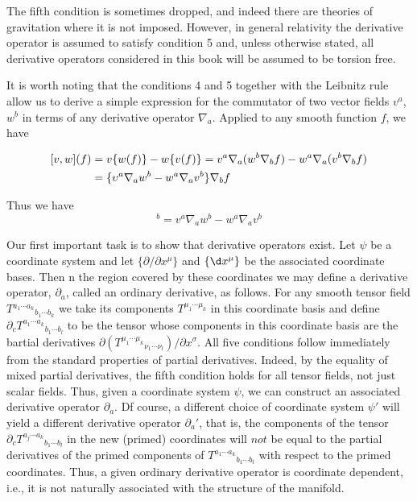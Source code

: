 The fifth condition is sometimes dropped, and indeed there are theories of gravitation where it is not imposed. However, in general relativity the derivative operator is assumed to satisfy condition 5 and, unless otherwise stated, all derivative operators considered in this book will be assumed to be torsion free.

It is worth noting that the conditions 4 and 5 together with the Leibnitz rule allow us to derive a simple expression for the commutator of two vector fields $v^a$, $w^b$ in terms of any derivative operator $\nabla_a$. Applied to any smooth function $f$, we have

\begin{equation}
\begin{aligned}\relax
[v,w](f)&=v\{w(f)\}-w\{v(f)\}=v^a\nabla_a(w^b\nabla_bf)-w^a\nabla_a(v^b\nabla_bf)\\
&=\{\upsilon^a\nabla_aw^b-w^a\nabla_av^b\}\nabla_bf
\end{aligned}
\label{3.1.1}
\end{equation}

Thus we have
\begin{equation}
    [v,w]^b=v^a\nabla_aw^b-w^a\nabla_av^b
\end{equation}

Our first important task is to show that derivative operators exist. Let $\psi$ be a coordinate system and let $\{\partial/\partial
x^\mu\}$ and $\{\d x^\mu\} $ be the associated coordinate bases. Then n the region covered by these coordinates we may define a derivative operator, $\partial_a$, called an ordinary derivative, as follows. For any smooth tensor field $T{^{a_1\cdots a_k}}_{b_1\cdots b_k}$ we take its components $T^{\mu_1\cdots\mu_k}$ in this coordinate basis and define $\partial_c{T^{a_1\cdots a_k}}_{b_1\cdots b_l}$ to be the tensor whose components in this coordinate basis are the bartial derivatives $\partial({T^{\mu_1\cdots\mu_k}}_{\nu_1\cdots\nu_l})/\partial x^\sigma$. All five conditions follow immediately from the standard properties of partial derivatives. Indeed, by the equality of mixed partial derivatives, the fifth condition holds for all tensor fields, not just scalar fields. Thus, given a coordinate system $\psi$, we can construct an associated derivative operator $\partial_a.$ Df course, a different choice of coordinate system $\psi'$ will yield a different derivative operator $\partial_a'$, that is, the components of the tensor $\partial_c{T^{a_j\cdots a_k}}_{b_1\cdots b_l}$ in the new (primed) coordinates will $not$ be equal to the partial derivatives of the primed components of ${T^{a_1\cdots a_k}}_{b_1\cdots b_l}$ with respect to the primed coordinates. Thus, a given ordinary derivative operator is coordinate dependent, i.e., it is not naturally associated with the structure of the manifold.

